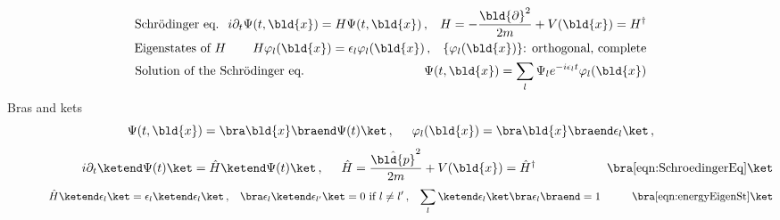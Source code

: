 \begin{eqnarray}
\mbox{Schr\"odinger eq.} \hspace{24mm} 
&\hspace{-5mm}&
\hspace{-20mm}
i \partial_t \Psi(t, \bld{x}) = {H} \Psi(t, \bld{x}) \,,
\hspace{3mm}
H = - \frac{\bld{\partial}^2}{2m} + V(\bld{x}) = H^\dagger
\label{eqn:SchroedingerEq}
\\
\mbox{Eigenstates of } H \hspace{22mm} 
&\hspace{-5mm}&
\hspace{-20mm}
H \varphi_l (\bld{x} ) = \epsilon_l \varphi_l (\bld{x} )\,,
\hspace{3mm}
\{ \varphi_l (\bld{x} ) \} \mbox{: orthogonal, complete}
\label{eqn:energyEigenSt}
\\
\mbox{Solution of the Schr\"odinger eq.}
&\hspace{-5mm}&
\Psi(t, \bld{x})
=
\sum_l \Psi_l e^{-i \epsilon_l t} \varphi_l (\bld{x})
\label{eqn:Psiexpansion}
\end{eqnarray}
%
Bras and kets
\begin{equation}
\Psi(t, \bld{x}) = \bra \bld{x} \braend \Psi(t) \ket\,,
\hspace{5mm}
\varphi_l(\bld{x})  = \bra \bld{x} \braend \epsilon_l \ket\,, 
\label{eqn:coordrepbraket}
\end{equation}
\begin{equation*}
\hspace{21mm}
i \partial_t  \ketend \Psi(t) \ket = \hat{H} \ketend \Psi(t) \ket\,,
\hspace{5mm}
\hat{H} = \frac{\hat{\bld{p}}^2}{2 m} + V(\bld{x}) = \hat{H}^\dagger
\hspace{20mm}
\bra \ref{eqn:SchroedingerEq} \ket
\end{equation*}
\begin{equation*}
\hspace{13mm}
\hat{H} 
\ketend \epsilon_l \ket
= 
\epsilon_l \ketend \epsilon_l \ket\,,
\hspace{3mm}
\bra \epsilon_l \ketend \epsilon_{l'} \ket = 0 \mbox{ if } l\neq l'\,,
\hspace{3mm}
\sum_l \ketend \epsilon_{l} \ket \bra \epsilon_{l} \braend = 1
\hspace{10mm}
\bra \ref{eqn:energyEigenSt} \ket
\end{equation*}

